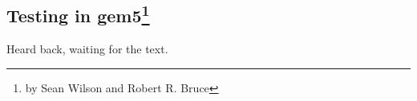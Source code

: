 \subsection[Testing in gem5]{Testing in gem5\footnote{by Sean Wilson and Robert R. Bruce}}
\label{sec:testing}

Heard back, waiting for the text.
